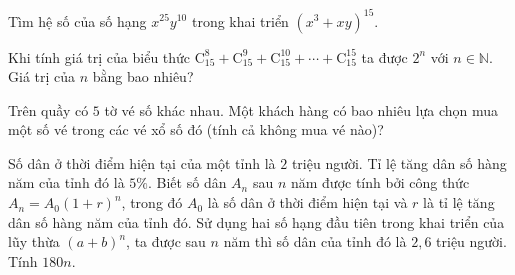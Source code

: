 \begin{ex}%
	Tìm hệ số của số hạng $x^{25}y^{10}$ trong khai triển $\left(x^3+xy\right)^{15}$.
	\par{}
\end{ex}
\begin{ex}%
	Khi tính giá trị của biểu thức  $\mathrm{C}_{15}^8+\mathrm{C}_{15}^9+\mathrm{C}_{15}^{10}+\cdots+\mathrm{C}_{15}^{15} $ ta được $2^n$ với $n\in\mathbb{N}$. Giá trị của $n$ bằng bao nhiêu?
	\par{}
\end{ex}
\begin{ex}%
	Trên quầy có $5$ tờ vé số khác nhau. Một khách hàng có bao nhiêu lựa chọn mua một số vé trong các vé xổ số đó (tính cả không mua vé nào)?
	\par{}
\end{ex}
\begin{ex}%
	Số dân ở thời điểm hiện tại của một tỉnh là $2$ triệu người. Tỉ lệ tăng dân số hàng năm của tỉnh đó là $5\%$. Biết số dân $A_n$ sau $n$ năm được tính bởi công thức $A_n=A_0(1+r)^n$, trong đó $A_0$ là số dân ở thời điểm hiện tại và $r$ là tỉ lệ tăng dân số hàng năm của tỉnh đó. Sử dụng hai số hạng đầu tiên trong khai triển của lũy thừa $(a+b)^n$, ta được sau $n$ năm thì số dân của tỉnh đó là $2{,}6$ triệu người. Tính $180 n$.
	\par{}
\end{ex}
